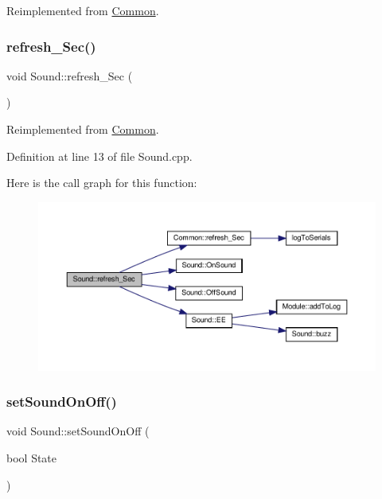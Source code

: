 Reimplemented from \hyperlink{class_common_acd1fdd47fbf8bb490f5c6d3ab6cd8d05}{Common}.

\mbox{\label{class_sound_a747a131af54af0747775b918aa3f7925}} 
\subsubsection{\texorpdfstring{refresh\+\_\+\+Sec()}{refresh\_Sec()}\hspace{0.1cm}{\footnotesize\ttfamily [2/2]}}
{\footnotesize\ttfamily void Sound\+::refresh\+\_\+\+Sec (\begin{DoxyParamCaption}{ }\end{DoxyParamCaption})\hspace{0.3cm}{\ttfamily [virtual]}}



Reimplemented from \hyperlink{class_common_acd1fdd47fbf8bb490f5c6d3ab6cd8d05}{Common}.



Definition at line 13 of file Sound.\+cpp.

Here is the call graph for this function\+:
\nopagebreak
\begin{figure}[H]
\begin{center}
\leavevmode
\includegraphics[width=350pt]{class_sound_a747a131af54af0747775b918aa3f7925_cgraph}
\end{center}
\end{figure}
\mbox{\label{class_sound_a6917e650a721b0e7fc6d998edf6a3cf7}} 
\subsubsection{\texorpdfstring{set\+Sound\+On\+Off()}{setSoundOnOff()}\hspace{0.1cm}{\footnotesize\ttfamily [1/2]}}
{\footnotesize\ttfamily void Sound\+::set\+Sound\+On\+Off (\begin{DoxyParamCaption}\item[{bool}]{State }\end{DoxyParamCaption})\hspace{0.3cm}{\ttfamily [protected]}}



